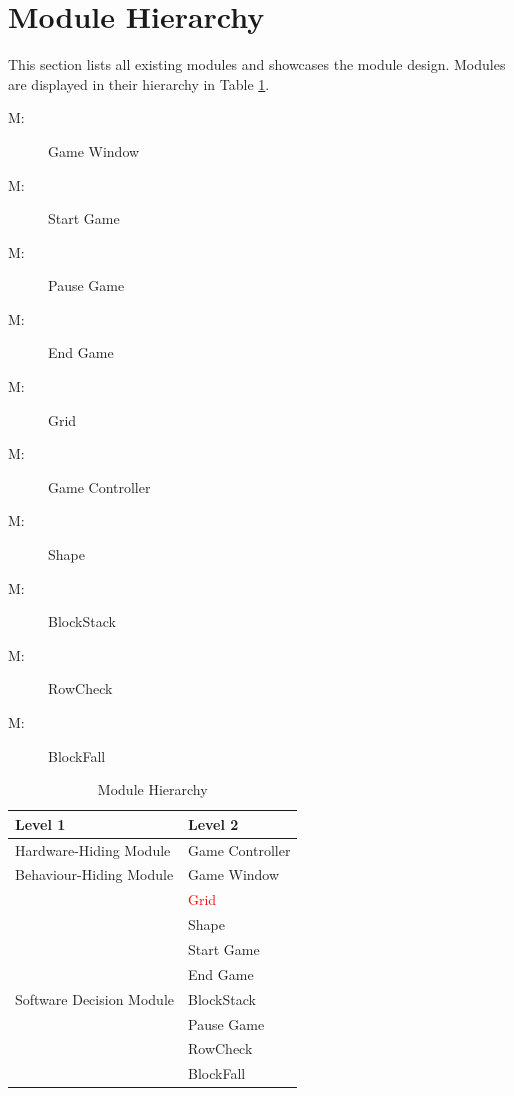 \documentclass[12pt, titlepage]{article}
\newcounter{mnum}
\newcommand{\mthemnum}{M\themnum}
\begin{document}
\newpage
\section{Module Hierarchy} \label{SecMH}

This section lists all existing modules and showcases the module design. Modules are displayed in their hierarchy in Table \ref{TblMH}.

\begin{description}
\item [ \mthemnum \label{mHH}:] Game Window
\item [ \mthemnum \label{mHH}:] Start Game
\item [ \mthemnum \label{mHH}:] Pause Game
\item [ \mthemnum \label{mHH}:] End Game
\item [ \mthemnum \label{mHH}:] Grid
\item [ \mthemnum \label{mHH}:] Game Controller
\item [ \mthemnum \label{mHH}:] Shape
\item [ \mthemnum \label{mHH}:] BlockStack
\item [ \mthemnum \label{mHH}:] RowCheck
\item [ \mthemnum \label{mHH}:] BlockFall

\end{description}


\begin{table}[h!]
\centering
\begin{tabular}{p{} p{}}
\toprule
\textbf{Level 1} & \textbf{Level 2}\\
\midrule

{Hardware-Hiding Module} & Game Controller\\
\midrule

\multirow{1}{0.3\textwidth}{Behaviour-Hiding Module} 
& Game Window\\  & {\textcolor{red}{Grid}}\\
\midrule

\multirow{8}{0.3\textwidth}{Software Decision Module}
& Shape\\
& Start Game\\
& End Game\\
& BlockStack\\
& Pause Game\\
& RowCheck\\
& BlockFall\\
\bottomrule

\end{tabular}
\caption{Module Hierarchy}
\label{TblMH}
\end{table}
\end{document}
